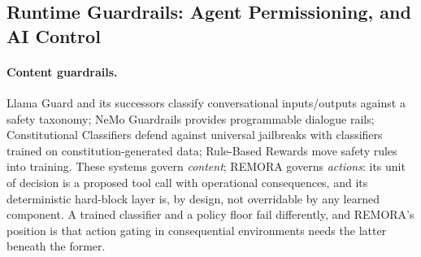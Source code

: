 \documentclass[10pt,twocolumn]{article}
\begin{document}
\subsection{Runtime Guardrails: Agent Permissioning, and AI Control}

\paragraph{Content guardrails.}
Llama Guard and its successors \cite{inan2023llamaguard} classify
conversational inputs/outputs against a safety taxonomy; NeMo Guardrails
\cite{rebedea2023nemo} provides programmable dialogue rails;
Constitutional Classifiers \cite{sharma2025constitutional} defend against
universal jailbreaks with classifiers trained on constitution-generated
data; Rule-Based Rewards \cite{mu2024rules} move safety rules into
training. These systems govern \emph{content}; REMORA governs
\emph{actions}: its unit of decision is a proposed tool call with
operational consequences, and its deterministic hard-block layer is, by
design, not overridable by any learned component. A trained classifier
and a policy floor fail differently, and REMORA's position is that action
gating in consequential environments needs the latter beneath the former.
\end{document}

